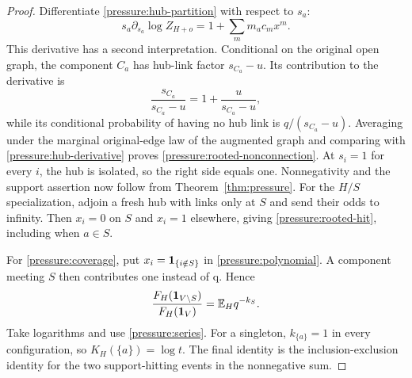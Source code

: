 \begin{proof}
Differentiate \eqref{pressure:hub-partition} with respect to $s_a$:
\begin{equation}
 s_a\partial_{s_a}\log Z_{H+o}
       =1+\sum_m m_a c_m x^m.
 \label{pressure:hub-derivative}
\end{equation}
This derivative has a second interpretation. Conditional on the
original open graph, the component $C_a$ has hub-link factor
$s_{C_a}-u$. Its contribution to the derivative is
\[
 \frac{s_{C_a}}{s_{C_a}-u}
   =1+\frac{u}{s_{C_a}-u},
\]
while its conditional probability of having no hub link is
$q/(s_{C_a}-u)$. Averaging under the marginal original-edge law of
the augmented graph and comparing with
\eqref{pressure:hub-derivative} proves
\eqref{pressure:rooted-nonconnection}. At $s_i=1$ for every $i$, the
hub is isolated, so the right side equals one. Nonnegativity and the
support assertion now follow from Theorem~\ref{thm:pressure}.
For the $H/S$ specialization, adjoin a fresh hub with links only at
$S$ and send their odds to infinity. Then $x_i=0$ on $S$ and $x_i=1$
elsewhere, giving \eqref{pressure:rooted-hit}, including when $a\in S$.

For \eqref{pressure:coverage}, put $x_i=\mathbf 1_{\{i\notin S\}}$ in
\eqref{pressure:polynomial}. A component meeting $S$ then contributes
one instead of q. Hence
\[
 \frac{F_H(\mathbf 1_{V\setminus S})}{F_H(\mathbf 1_V)}
       =\mathbb E_H q^{-k_S}.
\]
Take logarithms and use \eqref{pressure:series}. For a singleton,
$k_{\{a\}}=1$ in every configuration, so $K_H(\{a\})=\log t$.
The final identity is the inclusion-exclusion identity for the two
support-hitting events in the nonnegative sum.
\end{proof}

